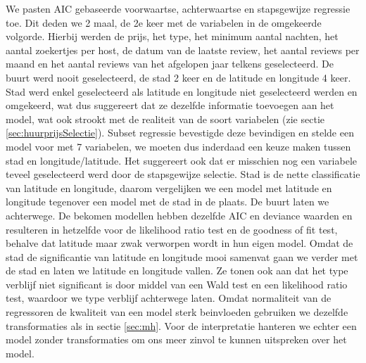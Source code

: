 \documentclass[a4paper,kulak]{kulakarticle} %
\begin{document}
We pasten AIC gebaseerde voorwaartse, achterwaartse en stapsgewijze regressie toe.
Dit deden we 2 maal, de 2e keer met de variabelen in de omgekeerde volgorde.
Hierbij werden de prijs, het type, het minimum aantal nachten, het aantal zoekertjes per host, de datum van de laatste review, het aantal reviews per maand en het aantal reviews van het afgelopen jaar telkens geselecteerd.
De buurt werd nooit geselecteerd, de stad 2 keer en de latitude en longitude 4 keer. Stad werd enkel geselecteerd als latitude en longitude niet geselecteerd werden en omgekeerd, wat dus suggereert dat ze dezelfde informatie toevoegen aan het model, wat ook strookt met de realiteit van de soort variabelen (zie sectie \ref{sec:huurprijsSelectie}).
Subset regressie bevestigde deze bevindigen en stelde een model voor met 7 variabelen, we moeten dus inderdaad een keuze maken tussen stad en longitude/latitude.
Het suggereert ook dat er misschien nog een variabele teveel geselecteerd werd door de stapsgewijze selectie.
Stad is de nette classificatie van latitude en longitude, daarom vergelijken we een model met latitude en longitude tegenover een model met de stad in de plaats.
De buurt laten we achterwege.
De bekomen modellen hebben dezelfde AIC en deviance waarden en resulteren in hetzelfde voor de likelihood ratio test en de goodness of fit test, behalve dat latitude maar zwak verworpen wordt in hun eigen model.
Omdat de stad de significantie van latitude en longitude mooi samenvat gaan we verder met de stad en laten we latitude en longitude vallen.  
Ze tonen ook aan dat het type verblijf niet significant is door middel van een Wald test en een likelihood ratio test, waardoor we type verblijf achterwege laten.
Omdat normaliteit van de regressoren de kwaliteit van een model sterk beinvloeden gebruiken we dezelfde transformaties als in sectie \ref{sec:mh}.
Voor de interpretatie hanteren we echter een model zonder transformaties om ons meer zinvol te kunnen uitspreken over het model. 
\end{document}
